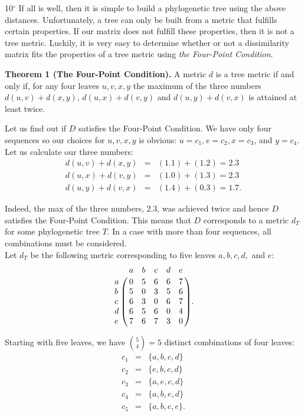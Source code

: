 \documentclass[a4paper]{article}
\begin{document}
\newpage

10$^\circ$ If all is well, then it is simple to build a phylogenetic tree using the above distances. Unfortunately, a tree can only be built from a metric that fulfills certain properties. If our matrix does not fulfill these properties, then it is not a tree metric. Luckily, it is very easy to determine whether or not a dissimilarity matrix fits the properties of a tree metric using \emph{the Four-Point Condition}. \\

\begin{adjustwidth}{.5in}{0pt}
\textbf{Theorem 1 (The Four-Point Condition).} A metric $d$ is a tree metric if and only if, for any four leaves $u,v,x,y$ the maximum of the three numbers $d(u,v) + d(x,y)$, $d(u,x) + d(v,y)$ and $d(u,y) + d(v,x)$ is attained at least twice. \\
\end{adjustwidth}

Let us find out if $D$ satisfies the Four-Point Condition. We have only four sequences so our choices for $u,v,x,y$ is obvious: $u = c_1, v = c_2, x = c_3$, and $y = c_4$. Let us calculate our three numbers:
\begin{eqnarray*}
d(u,v) + d(x,y) & = & (1.1) + (1.2) = 2.3 \\
d(u,x) + d(v,y) & = & (1.0) + (1.3) = 2.3 \\
d(u,y) + d(v,x) & = & (1.4) + (0.3) = 1.7.
\end{eqnarray*}

Indeed, the max of the three numbers, 2.3, was achieved twice and hence $D$ satisfies the Four-Point Condition. This means that $D$ corresponds to a metric $d_T$ for some phylogenetic tree $T$. In a case with more than four sequences, all combinations must be considered. \\

Let $d_T$ be the following metric corresponding to five leaves $a,b,c,d,$ and $e$: \\

\[ \bordermatrix{
\phantom{a} & a & b & c & d & e \cr
a & 0 & 5 & 6 & 6 & 7 \cr
b & 5 & 0 & 3 & 5 & 6 \cr
c & 6 & 3 & 0 & 6 & 7 \cr
d & 6 & 5 & 6 & 0 & 4 \cr
e & 7 & 6 & 7 & 3 & 0 \cr}. \]

Starting with five leaves, we have ${5 \choose 4} = 5$ distinct combinations of four leaves:
\begin{eqnarray*}
c_1 & = & \{a,b,c,d\} \\
c_2 & = & \{e,b,c,d\} \\
c_3 & = & \{a,e,c,d\} \\
c_4 & = & \{a,b,e,d\} \\
c_5 & = & \{a,b,c,e\}.
\end{eqnarray*} 
\end{document}

